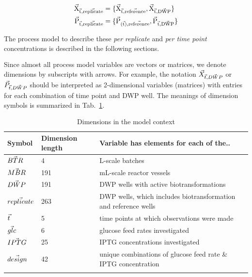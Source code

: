 \documentclass[sn-standardnature]{sn-jnl}%
\def\vec{\mathaccent "017E\relax }
\theoremstyle{thmstyleone}%
\theoremstyle{thmstyletwo}%
\theoremstyle{thmstylethree}%
\begin{document}
\begin{equation}
\begin{aligned}
    \mathrm{\vec{X}_{\vec{t},\vec{replicate}}} &= \{ \mathrm{\vec{X}_{\vec{t},\vec{reference}}}, \mathrm{\vec{X}_{\vec{t},\vec{DWP}}}\} \\
    \mathrm{\vec{P}_{\vec{t},\vec{replicate}}} &= \{ \mathrm{\vec{P}_{(\vec{t}),\vec{reference}}}, \mathrm{\vec{P}_{\vec{t},\vec{DWP}}}\} \\
\end{aligned}
\label{eq_XandP}
\end{equation}

The process model to describe these \textit{per replicate} and \textit{per time point} concentrations is described in the following sections.

Since almost all process model variables are vectors or matrices, we denote dimensions by subscripts with arrows.
For example, the notation $\vec{X}_{\vec{t},\vec{DWP}}$ or $\vec{P}_{\vec{t},\vec{DWP}}$ should be interpreted as 2-dimensional variables (matrices) with entries for each combination of time point and DWP well.
The meanings of dimension symbols is summarized in Tab.~\ref{tab_dimensions}.


\begin{table}[h]
    \begin{center}
    \begin{minipage}{\textwidth}
    \caption{Dimensions in the model context}
    \label{tab_dimensions}
    \begin{tabular}{@{}lll@{}}
\toprule
Symbol & Dimension length & Variable has elements for each of the..\\
\midrule
$\vec{BTR}$ & 4 & L-scale batches\\
$\vec{MBR}$ & 191 & mL-scale reactor vessels\\
$\vec{DWP}$ & 191 & DWP wells with active biotransformations\\
$\vec{replicate}$ & 263 & DWP wells, which includes biotransformation and reference wells\\
$\vec{t}$ & 5 & time points at which observations were made\\
$\vec{glc}$ & 6 & glucose feed rates investigated\\
$\vec{IPTG}$ & 25 & IPTG concentrations investigated\\
$\vec{design}$ & 42 & unique combinations of glucose feed rate \& IPTG concentration\\
\botrule
    \end{tabular}
    \end{minipage}
    \end{center}
\end{table}
\end{document}
